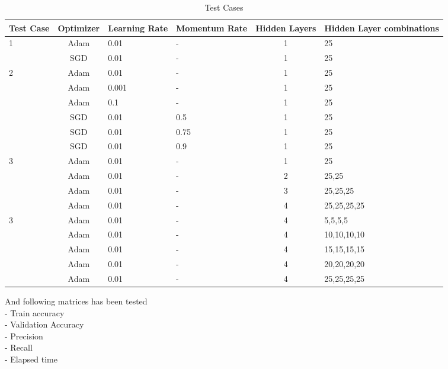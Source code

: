 \documentclass{article}
\begin{document}
\begin{table}[htbp]
\begin{center}
\begin{tabular}{ |p{1cm}|c|p{1.5cm}|p{1.5cm}|c|p{2cm}| } 
\hline
Test Case & Optimizer & Learning Rate & Momentum Rate & Hidden Layers & Hidden Layer combinations\\
\hline
1 & \cellcolor{black!10}Adam & 0.01 & - & 1 & 25 \\ 
& \cellcolor{black!10}SGD & 0.01 & - & 1 & 25 \\ 
\hline
2 & Adam & \cellcolor{black!10}0.01 & - & 1 & 25 \\ 
& Adam & \cellcolor{black!10}0.001 & - & 1 & 25 \\ 
& Adam & \cellcolor{black!10}0.1 & - & 1 & 25 \\ 
& SGD & 0.01 & \cellcolor{black!10}0.5 & 1 & 25 \\ 
& SGD & 0.01 & \cellcolor{black!10}0.75 & 1 & 25 \\ 
& SGD & 0.01 & \cellcolor{black!10}0.9 & 1 & 25 \\ 
\hline
3 & Adam & 0.01 & - & \cellcolor{black!10}1 & 25 \\ 
& Adam & 0.01 & - & \cellcolor{black!10}2 & 25,25 \\ 
& Adam & 0.01 & - & \cellcolor{black!10}3 & 25,25,25 \\
& Adam & 0.01 & - & \cellcolor{black!10}4 & 25,25,25,25 \\
\hline
3 & Adam & 0.01 & - & 4 & \cellcolor{black!10}5,5,5,5 \\ 
& Adam & 0.01 & - & 4 & \cellcolor{black!10}10,10,10,10 \\ 
& Adam & 0.01 & - & 4 & \cellcolor{black!10}15,15,15,15 \\
& Adam & 0.01 & - & 4 & \cellcolor{black!10}20,20,20,20 \\
& Adam & 0.01 & - & 4 & \cellcolor{black!10}25,25,25,25 \\
\hline
\end{tabular}
\caption{Test Cases}
\label{tab:testcases}
\end{center}
\end{table}

And following matrices has been tested \\
- Train accuracy \\
- Validation Accuracy \\
- Precision \\
- Recall \\
- Elapsed time \\
\end{document}

